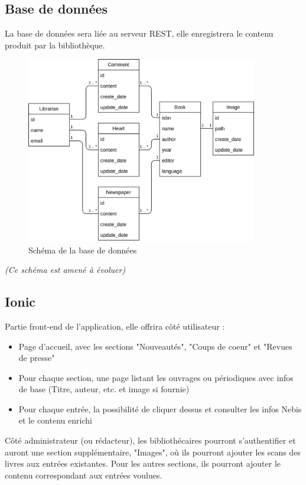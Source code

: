 \documentclass[a4paper, 12pt]{article}
\begin{document}
\subsection{Base de données}
La base de données sera liée au serveur REST, elle enregistrera le contenu produit par la bibliothèque.
\begin{figure}
	\begin{center}
		\includegraphics[width=0.9\textwidth]{images/bdd.png}
	\end{center}
	\caption{Schéma de la base de données}
\end{figure}
\textit{(Ce schéma est amené à évoluer)}

\subsection{Ionic}
Partie front-end de l'application, elle offrira côté utilisateur :
\begin{itemize}
	\item Page d'accueil, avec les sections "Nouveautés", "Coups de coeur" et "Revues de presse"
	\item Pour chaque section, une page listant les ouvrages ou périodiques avec infos de base 
		(Titre, auteur, etc. et image si fournie)
	\item Pour chaque entrée, la possibilité de cliquer dessus et consulter les infos Nebis et le contenu enrichi
\end{itemize}
Côté administrateur (ou rédacteur), les bibliothécaires pourront s'authentifier et auront une section supplémentaire, 
"Images", où ils pourront ajouter les scans des livres aux entrées existantes. Pour les autres sections, ils 
pourront ajouter le contenu correspondant aux entrées voulues. \cite{ref1}
\end{document}
